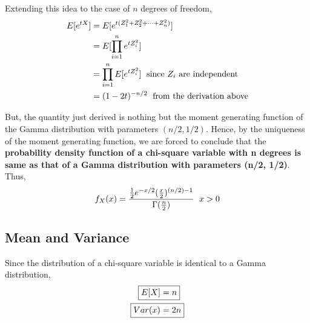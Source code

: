 \documentclass[../probability-notes.tex]{subfiles}
\begin{document}
    Extending this idea to the case of $n$ degrees of freedom,
    \begin{align*}
        E[e^{tX}] &= E[e^{t(Z_{1}^{2} + Z_{2}^{2} + \cdots + Z_{n}^{2})}]\\
        &= E[\prod_{i=1}^{n} e^{t Z_{i}^{2}}]\\
        &= \prod_{i=1}^{n} E[e^{t Z_{i}^{2}}] \text{\; since $Z_{i}$ are independent}\\
        &= (1 - 2t)^{-n/2} \text{\; from the derivation above}
    \end{align*}

    But, the quantity just derived is nothing but the moment generating function of the Gamma distribution with parameters $(n/2, 1/2)$. Hence, by the uniqueness of the moment generating function, we are forced to conclude that the \textbf{probability density function of a chi-square variable with n degrees is same as that of a Gamma distribution with parameters (n/2, 1/2)}.\newline
    Thus,
    \begin{align*}
        f_{X}(x) = \frac{\frac{1}{2} e^{-x/2} (\frac{x}{2})^{(n/2) - 1}}{\Gamma(\frac{n}{2})} \text{\; $x > 0$}
    \end{align*}
    \subsection{Mean and Variance}
    Since the distribution of a chi-square variable is identical to a Gamma distribution,
    \begin{align*}
        \Aboxed{E[X] &= n}\\
        \Aboxed{Var(x) &= 2n}
    \end{align*}
\end{document}
